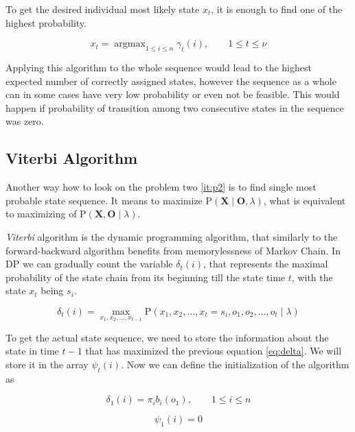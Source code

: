 \documentclass[thesis=M,english]{FITthesis}[2012/10/20]
\newcommand{\matr}[1]{\mathbf{#1}}
\newcommand{\argmax}{\mathop{\mathrm{argmax}}}
\begin{document}
To get the desired individual most likely state $x_t$, it is enough to find one of the highest probability.

\begin{equation}
x_t = \argmax_{1 \leq i \leq n} \gamma_t(i), \qquad 1 \leq t \leq \nu
\end{equation} 

Applying this algorithm to the whole sequence would lead to the highest expected number of correctly assigned states, however the sequence as a whole can in some cases have very low probability or even not be feasible. This would happen if probability of transition among two consecutive states in the sequence was zero.   
   
\subsection{Viterbi Algorithm} 

Another way how to look on the problem two \ref{it:p2} is to find single most probable state sequence. It means to maximize $\mathrm{P}(\matr{X}\mid \matr{O},\lambda)$, what is equivalent to maximizing of $\mathrm{P}(\matr{X}, \matr{O}\mid\lambda)$.

\textit{Viterbi} algorithm is the dynamic programming algorithm, that similarly to the forward-backward algorithm  benefits from memorylessness of Markov Chain. In DP we can gradually count the variable $\delta_t(i)$, that represents the maximal probability of the state chain from its beginning till the state time $t$, with the state $x_{t}$  being $s_i$.

\begin{equation}\label{eq:delta}
\delta_t(i) = \max_{x_1,x_2,\dots,x_{t-1}} \mathrm{P}( x_1,x_2,\dots, x_t = s_i, o_1, o_2, \dots, o_t \mid \lambda )
\end{equation} 

To get the actual state sequence, we need to store the information about the state in time $t-1$ that has maximized the previous equation \eqref{eq:delta}. We will store it in the array $\psi_t(i)$. Now we can define the initialization of the algorithm as

\begin{equation}
\delta_1(i) = \pi_i b_i(o_1), \qquad 1 \leq i \leq n 
\end{equation}

\begin{equation}
\psi_1(i) = 0 
\end{equation}
\end{document}
